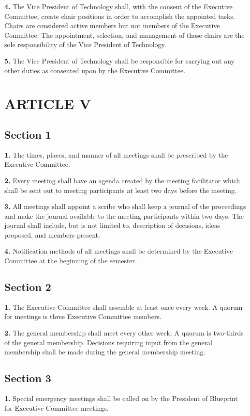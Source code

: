 \documentclass{article}
\begin{document}
\textbf{4.} The Vice President of Technology shall, with the consent of the Executive Committee, create chair positions in order to accomplish the appointed tasks. Chairs are considered active members but not members of the Executive Committee. The appointment, selection, and management of those chairs are the sole responsibility of the Vice President of Technology.

\textbf{5.} The Vice President of Technology shall be responsible for carrying out any other duties as consented upon by the Executive Committee.

\section{ARTICLE V}
\subsection{Section 1}
\textbf{1.} The times, places, and manner of all meetings shall be prescribed by the Executive Committee.

\textbf{2.} Every meeting shall have an agenda created by the meeting facilitator which shall be sent out to meeting participants at least two days before the meeting.

\textbf{3.} All meetings shall appoint a scribe who shall keep a journal of the proceedings and make the journal available to the meeting participants within two days. The journal shall include, but is not limited to, description of decisions, ideas proposed, and members present.

\textbf{4.} Notification methods of all meetings shall be determined by the Executive Committee at the beginning of the semester.

\subsection{Section 2}
\textbf{1.} The Executive Committee shall assemble at least once every week. A quorum for meetings is three Executive Committee members.

\textbf{2.} The general membership shall meet every other week. A quorum is two-thirds of the general membership. Decisions requiring input from the general membership shall be made during the general membership meeting.

\subsection{Section 3}
\textbf{1.} Special emergency meetings shall be called on by the President of Blueprint for Executive Committee meetings.
\end{document}
